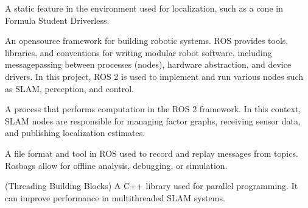 \documentclass[letterpaper,10pt,english]{sphinxmanual}
\begin{document}
\begin{description}
\sphinxAtStartPar
A static feature in the environment used for localization, such as a cone in Formula Student Driverless.

\sphinxAtStartPar
An open\sphinxhyphen{}source framework for building robotic systems. ROS provides tools, libraries, and conventions for writing modular robot software, including message\sphinxhyphen{}passing between processes (nodes), hardware abstraction, and device drivers. In this project, ROS 2 is used to implement and run various nodes such as SLAM, perception, and control.

\sphinxAtStartPar
A process that performs computation in the ROS 2 framework. In this context, SLAM nodes are responsible for managing factor graphs, receiving sensor data, and publishing localization estimates.

\sphinxAtStartPar
A file format and tool in ROS used to record and replay messages from topics. Rosbags  allow for offline analysis, debugging, or simulation.

\sphinxAtStartPar
(Threading Building Blocks) A C++ library used for parallel programming. It can improve performance in multi\sphinxhyphen{}threaded SLAM systems.

\end{description}



\renewcommand{\indexname}{Index}
\printindex
\end{document}
